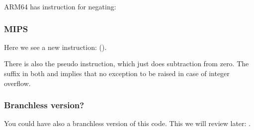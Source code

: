 ARM64 has instruction  for negating:



\subsubsection{MIPS}



Here we see a new instruction:  ().

There is also the  pseudo instruction, which just does subtraction from zero.
The  suffix in both  and  implies that no exception to be raised in case of integer overflow.

\subsubsection{Branchless version?}

You could have also a branchless version of this code. This we will review later: .
